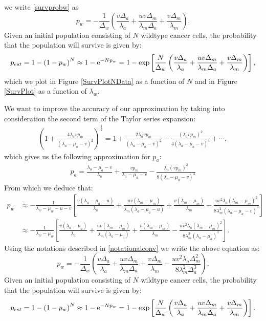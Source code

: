 \documentclass[11pt,a4paper]{article}
\newcommand{\e}{{\rm e}}
\begin{document}
we write \eqref{survprobw} as
\begin{equation}\label{survprobwapprox}
p_w=-\frac{1}{\Delta_w}\left(\frac{v\Delta_a}{\lambda_a}+\frac{uv\Delta_m}{\lambda_m\Delta_a}+\frac{v\Delta_m}{\lambda_m}\right).
\end{equation}
Given an initial population consisting of $N$ wildtype cancer cells, the probability that the population will survive is given by: 
\begin{align}
p_{est}=1-\left(1-p_w\right)^N\approx 1-\e^{-Np_w}=1-\exp\left[\frac{N}{\Delta_w}\left(\frac{v\Delta_a}{\lambda_a}+\frac{uv\Delta_m}{\lambda_m\Delta_a}+\frac{v\Delta_m}{\lambda_m}\right)\right],
\end{align}
which we plot in Figure \ref{SurvPlotNData} as a function of $N$ and in Figure \ref{SurvPlot} as a function of $\lambda_w$. 

We want to improve the accuracy of our approximation by taking into consideration the second term of the Taylor series expansion:
\begin{align*}
\left(1+\frac{4\lambda_avp_m}{\left(\lambda_a-\mu_a-v\right)^2}\right)^{\frac{1}{2}}=1+\frac{2\lambda_avp_m}{\left(\lambda_a-\mu_a-v\right)^2}-\frac{\left(\lambda_avp_m\right)^2}{4\left(\lambda_a-\mu_a-v\right)^4}+\cdots,
\end{align*}
which gives us the following approximation for $p_a$:
\begin{align}
p_a=\frac{\lambda_a-\mu_a-v}{\lambda_a}+\frac{vp_m}{\lambda_a-\mu_a-v}-\frac{\lambda_a\left(vp_m\right)^2}{8\left(\lambda_a-\mu_a-v\right)^3}
\end{align}
From which we deduce that:
\begin{align}\nonumber
p_w&\approx-\frac{1}{\lambda_w-\mu_w-u-v}\left[\frac{v\left(\lambda_a-\mu_a-u\right)}{\lambda_a}+\frac{uv\left(\lambda_m-\mu_m\right)}{\lambda_m\left(\lambda_a-\mu_a-u\right)}+\frac{v\left(\lambda_m-\mu_m\right)}{\lambda_m}-\frac{uv^2\lambda_a\left(\lambda_m-\mu_m\right)^2}{8\lambda_m^2\left(\lambda_a-\mu_a-v\right)^3}\right]\\ \label{survprobw3}
&\approx-\frac{1}{\lambda_w-\mu_w}\left[\frac{v\left(\lambda_a-\mu_a\right)}{\lambda_a}+\frac{uv\left(\lambda_m-\mu_m\right)}{\lambda_m\left(\lambda_a-\mu_a\right)}+\frac{v\left(\lambda_m-\mu_m\right)}{\lambda_m}-\frac{uv^2\lambda_a\left(\lambda_m-\mu_m\right)^2}{8\lambda_m^2\left(\lambda_a-\mu_a\right)^3}\right].
\end{align}
Using the notations described in \eqref{notationalconv} we write the above equation as:
\begin{equation}\label{survprobwapproxcorrected}
p_w=-\frac{1}{\Delta_w}\left(\frac{v\Delta_a}{\lambda_a}+\frac{uv\Delta_m}{\lambda_m\Delta_a}+\frac{v\Delta_m}{\lambda_m}-\frac{uv^2\lambda_a\Delta_m^2}{8\lambda_m^2\Delta_a^3}\right).
\end{equation}
Given an initial population consisting of $N$ wildtype cancer cells, the probability that the population will survive is given by: 
\begin{align}
p_{est}=1-\left(1-p_w\right)^N\approx 1-\e^{-Np_w}=1-\exp\left[\frac{N}{\Delta_w}\left(\frac{v\Delta_a}{\lambda_a}+\frac{uv\Delta_m}{\lambda_m\Delta_a}+\frac{v\Delta_m}{\lambda_m}\right)\right].
\end{align}
\end{document}
